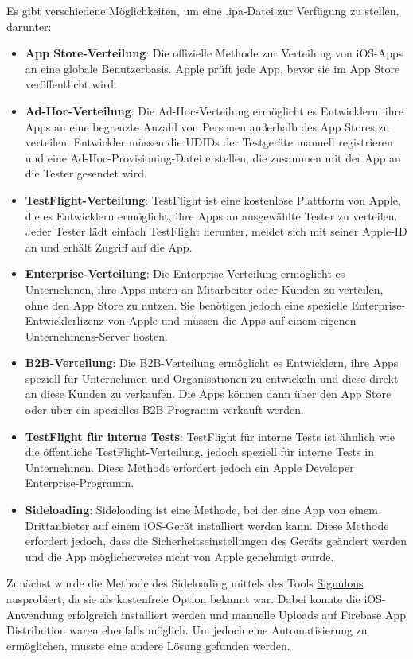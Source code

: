 Es gibt verschiedene Möglichkeiten, um eine .ipa-Datei zur
Verfügung zu stellen, darunter:

\begin{itemize}
  \item \textbf{App Store-Verteilung}: Die offizielle Methode zur Verteilung von iOS-Apps an eine globale Benutzerbasis. Apple prüft jede App, bevor sie im App Store veröffentlicht wird.
  \item \textbf{Ad-Hoc-Verteilung}: Die Ad-Hoc-Verteilung ermöglicht es Entwicklern, ihre Apps an eine begrenzte Anzahl von Personen außerhalb des App Stores zu verteilen. Entwickler müssen die UDIDs der Testgeräte manuell registrieren und eine Ad-Hoc-Provisioning-Datei erstellen, die zusammen mit der App an die Tester gesendet wird.
  \item \textbf{TestFlight-Verteilung}: TestFlight ist eine kostenlose Plattform von Apple, die es Entwicklern ermöglicht, ihre Apps an ausgewählte Tester zu verteilen. Jeder Tester lädt einfach TestFlight herunter, meldet sich mit seiner Apple-ID an und erhält Zugriff auf die App.
  \item \textbf{Enterprise-Verteilung}: Die Enterprise-Verteilung ermöglicht es Unternehmen, ihre Apps intern an Mitarbeiter oder Kunden zu verteilen, ohne den App Store zu nutzen. Sie benötigen jedoch eine spezielle Enterprise-Entwicklerlizenz von Apple und müssen die Apps auf einem eigenen Unternehmens-Server hosten.
  \item \textbf{B2B-Verteilung}: Die B2B-Verteilung ermöglicht es Entwicklern, ihre Apps speziell für Unternehmen und Organisationen zu entwickeln und diese direkt an diese Kunden zu verkaufen. Die Apps können dann über den App Store oder über ein spezielles B2B-Programm verkauft werden.
  \item \textbf{TestFlight für interne Tests}: TestFlight für interne Tests ist ähnlich wie die öffentliche TestFlight-Verteilung, jedoch speziell für interne Tests in Unternehmen. Diese Methode erfordert jedoch ein Apple Developer Enterprise-Programm.
  \item \textbf{Sideloading}: Sideloading ist eine Methode, bei der eine App von einem Drittanbieter auf einem iOS-Gerät installiert werden kann. Diese Methode erfordert jedoch, dass die Sicherheitseinstellungen des Geräts geändert werden und die App möglicherweise nicht von Apple genehmigt wurde.
\end{itemize}

Zunächst wurde die Methode des Sideloading mittels des
Tools \href{https://www.signulous.com/}{Signulous} ausprobiert,
da sie als kostenfreie Option bekannt war. Dabei konnte
die iOS-Anwendung erfolgreich installiert werden und
manuelle Uploads auf Firebase App Distribution waren
ebenfalls möglich. Um jedoch eine Automatisierung zu
ermöglichen, musste eine andere Lösung gefunden werden.

